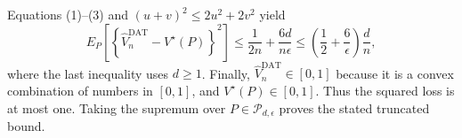 Equations (1)--(3) and \((u+v)^2\le2u^2+2v^2\) yield
\[
 E_P\!\left[
  \left\{\widehat V_n^{\mathrm{DAT}}-V^\star(P)\right\}^2
 \right]
 \le \frac1{2n}+\frac{6d}{n\epsilon}
 \le \left(\frac12+\frac6\epsilon\right)\frac dn,
\]
where the last inequality uses \(d\ge1\).  Finally, \(\widehat V_n^{\mathrm{DAT}}\in[0,1]\) because it is a convex combination of numbers in \([0,1]\), and \(V^\star(P)\in[0,1]\).  Thus the squared loss is at most one.  Taking the supremum over \(P\in\mathcal P_{d,\epsilon}\) proves the stated truncated bound.